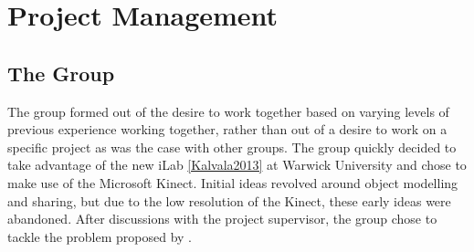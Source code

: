 \chapter{Project Management}
\label{project management}

\section{The Group}
The group formed out of the desire to work together based on varying levels of previous experience working together, rather than out of a desire to work on a specific project as was the case with other groups.
The group quickly decided to take advantage of the new iLab \ref{Kalvala2013} at Warwick University and chose to make use of the Microsoft Kinect.
Initial ideas revolved around object modelling and sharing, but due to the low resolution of the Kinect, these early ideas were abandoned.
After discussions with the project supervisor, the group chose to tackle the problem proposed by .\\

